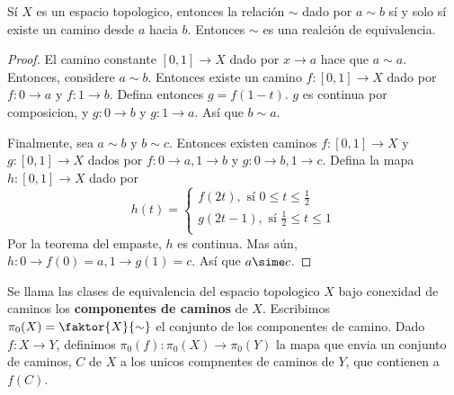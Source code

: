 \begin{theorem}\label{thm_9.19}
    S\'i $X$ es un espacio topologico, entonces la relaci\'on  $\sim$ dado por
    $a \sim b$ s\'i y solo s\'i existe un camino desde  $a$ hacia  $b$. Entonces
     $\sim$ es una realci\'on de equivalencia.
\end{theorem}
\begin{proof}
    El camino constante $[0,1] \xrightarrow{} X$ dado por $x \xrightarrow{} a$
    hace que $a \sim a$. Entonces, considere  $a \sim b$. Entonces existe un
    camino  $f:[0,1] \xrightarrow{} X$ dado por $f:0 \xrightarrow{} a$ y $f:1
    \xrightarrow{} b$. Defina entonces $g=f(1-t)$. $g$ es continua por
    composicion, y  $g:0 \xrightarrow{} b$ y $g:1 \xrightarrow{} a$. As\'i que
    $b \sim a$.

    Finalmente, sea  $a \sim b$ y  $b \sim c$. Entonces existen caminos
    $f:[0,1] \xrightarrow{} X$ y $g:[0,1] \xrightarrow{} X$ dados por $f:0
    \xrightarrow{} a, 1 \xrightarrow{} b$ y $g:0 \xrightarrow{} b, 1
    \xrightarrow{} c$. Defina la mapa $h:[0,1] \xrightarrow{} X$ dado por
    \begin{equation*}
        h(t)=\begin{cases}
            f(2t), \text{ s\'i } 0 \leq t \leq \frac{1}{2}  \\
            g(2t-1), \text{ s\'i } \frac{1}{2} \leq t \leq 1  \\
        \end{cases}
    \end{equation*}
    Por la teorema del empaste, $h$ es continua. Mas a\'un,  $h:0 \xrightarrow{}
    f(0)=a, 1 \xrightarrow{} g(1)=c$. As\'i que $a \sime c$.
\end{proof}

\begin{definition}
    Se llama las clases de equivalencia del espacio topologico $X$ bajo conexidad
    de caminos los \textbf{componentes de caminos} de $X$. Escribimos
    $\pi_0(X)=\faktor{X}{\sim}$ el conjunto de los componentes de camino.
    Dado $f:X \xrightarrow{} Y$, definimos $\pi_0(f):\pi_0(X) \xrightarrow{}
    \pi_0(Y)$ la mapa que envia un conjunto de caminos, $C$ de $X$ a los unicos
    compnentes de caminos de $Y$, que contienen a $f(C)$.
\end{definition}

